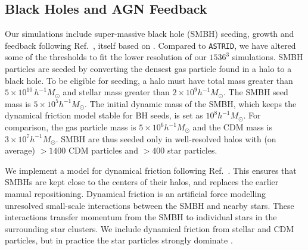\documentclass[a4paper,11pt]{article}
\newcommand{\astrid}{\texttt{ASTRID}}
\begin{document}
\subsection{Black Holes and AGN Feedback}
\label{sec:agn}

Our simulations include super-massive black hole (SMBH) seeding, growth and feedback following Ref.~\cite{Ni:2022}, itself based on \cite{Feng:2016,SDH2005,DSH2005}. Compared to \astrid, we have altered some of the thresholds to fit the lower resolution of our $1536^3$ simulations. SMBH particles are seeded by converting the densest gas particle found in a halo to a black hole. To be eligible for seeding, a halo must have total mass greater than $5\times 10^{10}\,h^{-1}M_\odot$ and stellar mass greater than $2 \times 10^9 h^{-1} M_\odot$. The SMBH seed mass is $5 \times 10^{5} h^{-1} M_\odot$. The initial dynamic mass of the SMBH, which keeps the dynamical friction model stable for BH seeds, is set as $10^{8} h^{-1} M_\odot$. For comparison, the gas particle mass is $5 \times 10^6 h^{-1} M_\odot$ and the CDM mass is $ 3 \times 10^7 h^{-1} M_\odot$. SMBH are thus seeded only in well-resolved halos with (on average) $> 1400$ CDM particles and $>400$ star particles.

We implement a model for dynamical friction following Ref.~\citep{Chen:2021}. This ensures that SMBHs are kept close to the centers of their halos, and replaces the earlier manual repositioning. Dynamical friction is an artificial force modelling unresolved small-scale interactions between the SMBH and nearby stars. These interactions transfer momentum from the SMBH to individual stars in the surrounding star clusters. We include dynamical friction from stellar and CDM particles, but in practice the star particles strongly dominate \cite{Chen:2021}.
\end{document}
